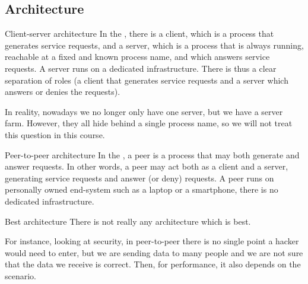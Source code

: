 \documentclass[a4paper]{article}
\begin{document}
\subsection{Architecture}
\begin{parag}{Client-server architecture}
    In the , there is a client, which is a process that generates service requests, and a server, which is a process that is always running, reachable at a fixed and known process name, and which answers service requests. A server runs on a dedicated infrastructure. There is thus a clear separation of roles (a client that generates service requests and a server which answers or denies the requests).

    In reality, nowadays we no longer only have one server, but we have a server farm. However, they all hide behind a single process name, so we will not treat this question in this course.
\end{parag}

\begin{parag}{Peer-to-peer architecture}
    In the , a peer is a process that may both generate and answer requests. In other words, a peer may act both as a client and a server, generating service requests and answer (or deny) requests. A peer runs on personally owned end-system such as a laptop or a smartphone, there is no dedicated infrastructure.
\end{parag}

\begin{parag}{Best architecture}
    There is not really any architecture which is best.

    For instance, looking at security, in peer-to-peer there is no single point a hacker would need to enter, but we are sending data to many people and we are not sure that the data we receive is correct. Then, for performance, it also depends on the scenario.
\end{parag}
\end{document}
